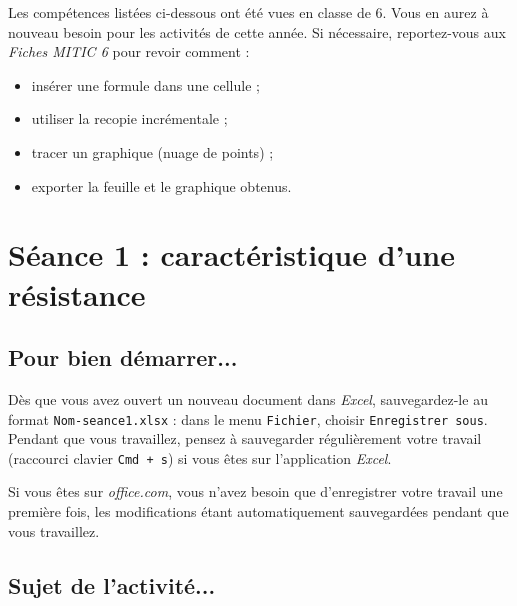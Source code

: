 \phantom{rien}

Les compétences listées ci-dessous ont été vues en classe de 6. Vous en aurez à nouveau besoin pour les activités de cette année. Si nécessaire, reportez-vous aux \emph{Fiches MITIC 6} pour revoir comment :  

\begin{itemize}
\item insérer une formule dans une cellule ;
\item utiliser la recopie incrémentale ;
\item tracer un graphique (nuage de points) ;
\item exporter la feuille et le graphique obtenus.
\end{itemize}



%
%
%
%

\newpage



\section{Séance 1 : caractéristique d'une résistance}\label{ficheTableur5e1}


\subsection{Pour bien démarrer...}

Dès que vous avez ouvert un nouveau document dans \emph{Excel}, sauvegardez-le au format \texttt{Nom-seance1.xlsx} : dans le menu \texttt{Fichier}, choisir \texttt{Enregistrer sous}. Pendant que vous travaillez, pensez à sauvegarder régulièrement votre travail (raccourci clavier \texttt{Cmd + s}) si vous êtes sur l'application \emph{Excel}.


Si vous êtes sur \emph{office.com}, vous n'avez besoin que d'enregistrer votre travail une première fois, les modifications étant automatiquement sauvegardées pendant que vous travaillez.


\subsection{Sujet de l'activité...}

